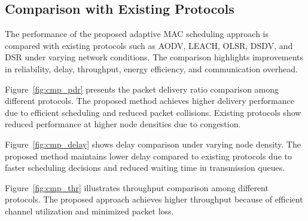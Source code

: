 \documentclass[a4paper,fleqn]{cas-dc}
\numberwithin{equation}{section}
\begin{document}
\vspace{0.3cm}

\subsection{Comparison with Existing Protocols}

The performance of the proposed adaptive MAC scheduling approach is compared with existing protocols such as AODV, LEACH, OLSR, DSDV, and DSR under varying network conditions. The comparison highlights improvements in reliability, delay, throughput, energy efficiency, and communication overhead.


\begin{center}

\label{fig:cmp_pdr}
\end{center}

Figure~\ref{fig:cmp_pdr} presents the packet delivery ratio comparison among different protocols. The proposed method achieves higher delivery performance due to efficient scheduling and reduced packet collisions. Existing protocols show reduced performance at higher node densities due to congestion.

\vspace{0.3cm}


\begin{center}

\label{fig:cmp_delay}
\end{center}

Figure~\ref{fig:cmp_delay} shows delay comparison under varying node density. The proposed method maintains lower delay compared to existing protocols due to faster scheduling decisions and reduced waiting time in transmission queues.

\vspace{0.3cm}


\begin{center}

\label{fig:cmp_thr}
\end{center}

Figure~\ref{fig:cmp_thr} illustrates throughput comparison among different protocols. The proposed approach achieves higher throughput because of efficient channel utilization and minimized packet loss.
\end{document}
